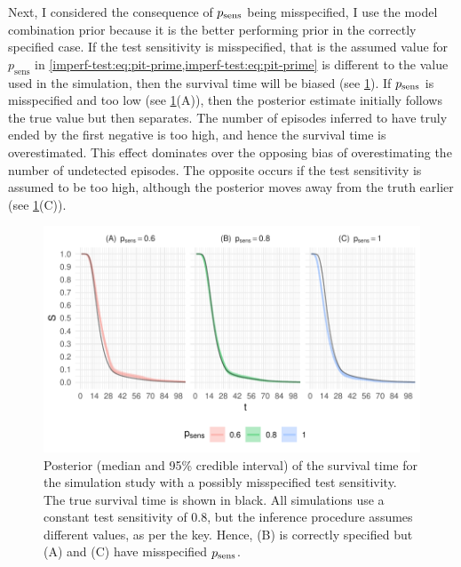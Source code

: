 \documentclass[thesis.tex]{subfiles}
\begin{document}
Next, I considered the consequence of $p_\text{sens}$ being misspecified, I use the model combination prior because it is the better performing prior in the correctly specified case.
If the test sensitivity is misspecified, that is the assumed value for $p_\text{sens}$ in \cref{imperf-test:eq:pit-prime,imperf-test:eq:pit-prime} is different to the value used in the simulation, then the survival time will be biased (see \cref{imperf-test:fig:misspecified-test-sensitivity}).
If $p_\text{sens}$ is misspecified and too low (see \cref{imperf-test:fig:misspecified-test-sensitivity}(A)), then the posterior estimate initially follows the true value but then separates.
The number of episodes inferred to have truly ended by the first negative is too high, and hence the survival time is overestimated.
This effect dominates over the opposing bias of overestimating the number of undetected episodes.
The opposite occurs if the test sensitivity is assumed to be too high, although the posterior moves away from the truth earlier (see \cref{imperf-test:fig:misspecified-test-sensitivity}(C)).
\begin{figure}
    \includegraphics[width=\textwidth]{cis-imperfect-testing/sim-misspecified-sensitivity}
  \caption[Simulation study results with misspecified test sensitivity]{%
    Posterior (median and 95\% credible interval) of the survival time for the simulation study with a possibly misspecified test sensitivity.
    The true survival time is shown in black.
    All simulations use a constant test sensitivity of 0.8, but the inference procedure assumes different values, as per the key.
    Hence, (B) is correctly specified but (A) and (C) have misspecified $p_\text{sens}$.
  }
  \label{imperf-test:fig:misspecified-test-sensitivity}
\end{figure}
\end{document}
